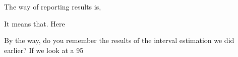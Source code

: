 \documentclass{ltjsarticle}
\begin{document}
The way of reporting results is,

It means that. Here

By the way, do you remember the results of the interval estimation we did earlier? If we look at a 95%
\end{document}
